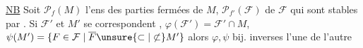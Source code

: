 \uline{NB} Soit $\mathcal P_f(M)$ l'ens des parties fermées de $M$, $\mathcal P_{f'}(\mathcal F)$ de $\mathcal F$ qui sont stables par . Si $\mathcal F'$ et $M'$ se correspondent , 
$\varphi(\mathcal F')=\mathcal F'\cap M$, $\psi(M')=\{F\in\mathcal F\mid\overline F\unsure{\subset|\not\subset}M'\}$ alors $\varphi,\psi$ bij. inverses l'une de l'autre
